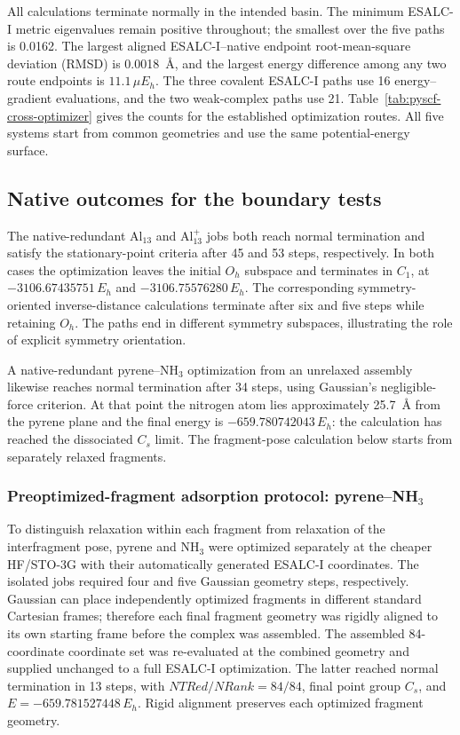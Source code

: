 \documentclass[10pt]{article}
\begin{document}
{All calculations terminate normally in the intended basin.  The minimum
ESALC-I metric eigenvalues remain positive throughout; the smallest over the
five paths is 0.0162.  The largest aligned ESALC-I--native endpoint
{root-mean-square deviation (RMSD)} is
0.0018~\AA{}, and the largest energy difference among any two route endpoints
is \(11.1\,\mu E_h\).  The three covalent ESALC-I paths use 16 energy--gradient evaluations,
and the two weak-complex paths use 21. Table~\ref{tab:pyscf-cross-optimizer}
gives the counts for the established optimization routes. All five systems
start from common geometries and use the same potential-energy surface.

\subsection{Native outcomes for the boundary tests}

The native-redundant Al$_{13}$ and Al$_{13}^{+}$ jobs both reach normal
termination and satisfy the stationary-point criteria after 45 and 53 steps,
respectively.  In both cases the optimization leaves the initial \(O_h\)
subspace and terminates in \(C_1\), at
\(-3106.67435751\,E_h\) and \(-3106.75576280\,E_h\).  The corresponding
symmetry-oriented inverse-distance calculations terminate after six and five
steps while retaining \(O_h\).  The paths end in different symmetry subspaces, illustrating the role of
explicit symmetry orientation.

A native-redundant pyrene--NH$_3$ optimization from an
unrelaxed assembly likewise reaches normal termination after 34 steps, using
Gaussian's negligible-force criterion.  At that point the nitrogen atom lies
approximately 25.7~\AA{} from the pyrene plane and the final energy is
\(-659.780742043\,E_h\): the calculation has reached the dissociated
\(C_s\) limit.  The fragment-pose calculation below starts from separately relaxed fragments.

\subsubsection{\texorpdfstring{Preoptimized-fragment adsorption protocol: pyrene--NH$_3$}{Preoptimized-fragment adsorption protocol: pyrene--NH3}}

To distinguish relaxation within each fragment from relaxation of the
interfragment pose, pyrene and NH$_3$ were optimized separately at the cheaper HF/STO-3G
with their automatically generated ESALC-I coordinates.  The isolated jobs
required four and five Gaussian geometry steps, respectively.  Gaussian can
place independently optimized fragments in different standard Cartesian
frames; therefore each final fragment geometry was rigidly aligned to its own
starting frame before the complex was assembled.  The assembled 84-coordinate
coordinate set was re-evaluated at the combined geometry and supplied unchanged to a
full ESALC-I optimization.  The latter reached normal termination in 13 steps,
with \(NTRed/NRank=84/84\), final point group \(C_s\), and
\(E=-659.781527448\,E_h\).  Rigid alignment preserves each optimized fragment geometry.

}
\end{document}

